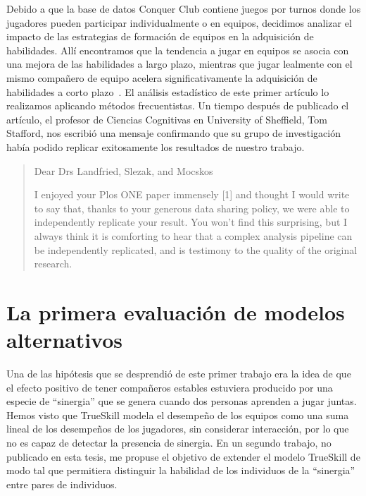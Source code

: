 \documentclass[a4paper,11pt]{book}
\theoremstyle{definition}
\begin{document}

Debido a que la base de datos Conquer Club contiene juegos por turnos donde los jugadores pueden participar individualmente o en equipos, decidimos analizar el impacto de las estrategias de formaci\'on de equipos en la adquisici\'on de habilidades.
%
All\'i encontramos que la tendencia a jugar en equipos se asocia con una mejora de las habilidades a largo plazo, mientras que jugar lealmente con el mismo compa\~nero de equipo acelera significativamente la adquisici\'on de habilidades a corto plazo~\cite{Landfried2019}.
%
El an\'alisis estad\'istico de este primer art\'iculo lo realizamos aplicando m\'etodos frecuentistas.
%
Un tiempo despu\'es de publicado el art\'iculo, el profesor de Ciencias Cognitivas en University of Sheffield, Tom Stafford, nos escribi\'o una mensaje confirmando que su grupo de investigaci\'on hab\'ia podido replicar exitosamente los resultados de nuestro trabajo.
%
\begin{quotation}
Dear Drs Landfried, Slezak, and Mocskos

I enjoyed your Plos ONE paper immensely [1] and thought I would write to say that, thanks to your generous data sharing policy, we were able to independently replicate your result. You won't find this surprising, but I always think it is comforting to hear that a complex analysis pipeline can be independently replicated, and is testimony to the quality of the original research.
\end{quotation}




\section{La primera evaluaci\'on de modelos alternativos}

Una de las hip\'otesis que se desprendi\'o de este primer trabajo era la idea de que el efecto positivo de tener compa\~neros estables estuviera producido por una especie de ``sinergia'' que se genera cuando dos personas aprenden a jugar juntas.
%
Hemos visto que TrueSkill modela el desempe\~no de los equipos como una suma lineal de los desempe\~nos de los jugadores, sin considerar interacci\'on, por lo que no es capaz de detectar la presencia de sinergia.
%
En un segundo trabajo, no publicado en esta tesis, me propuse el objetivo de extender el modelo TrueSkill de modo tal que permitiera distinguir la habilidad de los individuos de la ``sinergia'' entre pares de individuos.
\end{document}
